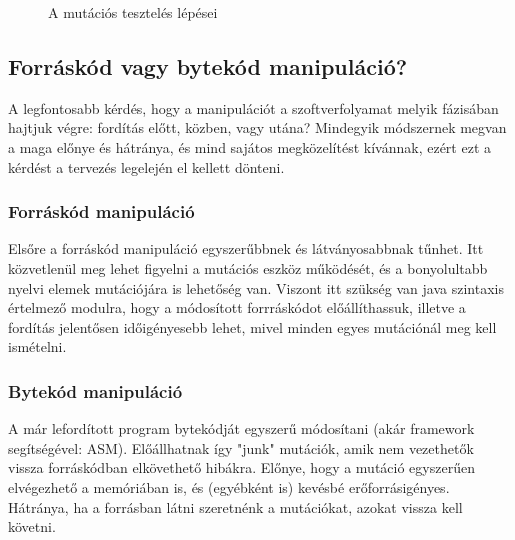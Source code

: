 \begin{figure}
\centering
{}

\caption{A mutációs tesztelés lépései} \label{fig:steps}
\end{figure}

\subsection{Forráskód vagy bytekód manipuláció?}
A legfontosabb kérdés, hogy a manipulációt a szoftverfolyamat melyik fázisában hajtjuk végre: fordítás előtt, közben, vagy utána? Mindegyik módszernek megvan a maga előnye és hátránya, és mind sajátos megközelítést kívánnak, ezért ezt a kérdést a tervezés legelején el kellett dönteni.
\subsubsection{Forráskód manipuláció}
Elsőre a forráskód manipuláció egyszerűbbnek és látványosabbnak tűnhet. Itt közvetlenül meg lehet figyelni a mutációs eszköz működését, és a bonyolultabb nyelvi elemek mutációjára is lehetőség van. Viszont itt szükség van java szintaxis értelmező modulra, hogy a módosított forrráskódot előállíthassuk, illetve a fordítás jelentősen időigényesebb lehet, mivel minden egyes mutációnál meg kell ismételni.
\subsubsection{Bytekód manipuláció}
A már lefordított program bytekódját egyszerű módosítani (akár framework segítségével: ASM). Előállhatnak így "junk" mutációk, amik nem vezethetők vissza forráskódban elkövethető hibákra. Előnye, hogy a mutáció egyszerűen elvégezhető a memóriában is, és (egyébként is) kevésbé erőforrásigényes. Hátránya, ha a forrásban látni szeretnénk a mutációkat, azokat vissza kell követni.
